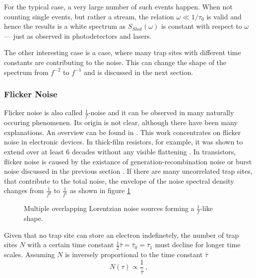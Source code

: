 For the typical case, a very large number of such events happen. When not counting single events, but rather a stream, the relation $\omega \ll 1/\tau_0$ is valid and hence the results is a white spectrum as $S_{Shot}(\omega)$ is constant with respect to $\omega$ --- just as observed in photodetectors and lasers.

The other interesting case is a case, where many trap sites with different time constants are contributing to the noise. This can change the shape of the spectrum from $f^{-2}$ to $f^{-1}$ and is discussed in the next section.

\clearpage
\subsubsection{Flicker Noise}
\label{sec:flicker_noise}
Flicker noise is also called $\frac 1 f$-noise and it can be observed in many naturally occuring phenomenen. Its origin is not clear, although there have been many explanations. An overview can be found in \cite{flicker_noise_overview, flicker_noise_overview2, origins_1_f_noise}. This work concentrates on flicker noise in electronic devices. In thick-film resistors, for example, it was shown to extend over at least 6 decades without any visible flattening \cite{1_f_noise_thick_film}. In transistors, flicker noise is caused by the existance of generation-recombination noise or burst noise discussed in the previous section \cite{origins_1_f_noise}. If there are many uncorrelated trap sites, that contribute to the total noise, the envelope of the noise spectral density changes from $\frac{1}{f^2}$ to $\frac{1}{f^1}$ as shown in figure \ref{fig:flicker_noise_evelope}

\begin{figure}[hb]
    \centering
    
    \caption{Multiple overlapping Lorentzian noise sources forming a $\frac 1 f$-like shape.}
    \label{fig:flicker_noise_evelope}
\end{figure}

Given that no trap site can store an electron indefinetely, the number of trap sites $N$ with a certain time constant $\frac 1 2 \bar \tau = \bar \tau_0 = \bar \tau_1$ must decline for longer time scales. Assuming $N$ is inversely proportional to the time constant $\bar \tau$
\begin{equation}
    N(\tau) \propto \frac{1}{\bar \tau}\,, \label{eqn:flicker_noise_weight_function}
\end{equation}

